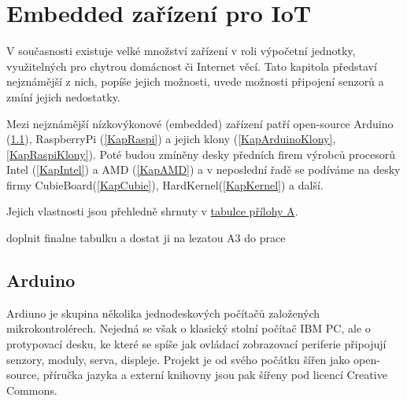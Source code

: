 \chapter{Embedded zařízení pro IoT}

V současnosti existuje velké množství zařízení v roli výpočetní jednotky, využitelných pro chytrou domácnost či Internet věcí. Tato kapitola představí nejznámější z nich, popíše jejich možnosti, uvede možnosti připojení senzorů a zmíní jejich nedostatky. 

Mezi nejznámější nízkovýkonové (embedded) zařízení patří open-source Arduino (\ref{KapArduino}), RaspberryPi (\ref{KapRaspi}) a jejich klony (\ref{KapArduinoKlony}, \ref{KapRaspiKlony}). Poté budou zmíněny desky předních firem výrobců procesorů Intel (\ref{KapIntel}) a AMD (\ref{KapAMD}) a v neposlední řadě se podíváme na desky firmy CubieBoard(\ref{KapCubie}), HardKernel(\ref{KapKernel}) a další. 

Jejich vlastnosti jsou přehledně shrnuty v \hyperlink{apendix-tablebig}{tabulce přílohy A}.

\colorbox[rgb]{1,0,0}{doplnit finalne tabulku a dostat ji na lezatou A3 do prace}



\section{Arduino}
\label{KapArduino}

	Ardiuno je skupina několika jednodeskových počítačů založených mikrokontrolérech. Nejedná se však o klasický stolní počítač IBM PC, ale o protypovací desku, ke které se spíše jak ovládací  zobrazovací periferie připojují senzory, moduly, serva, displeje. Projekt je od svého počátku šířen jako open-source, příručka jazyka a externí knihovny jsou pak šířeny pod licencí Creative Commons.
	
